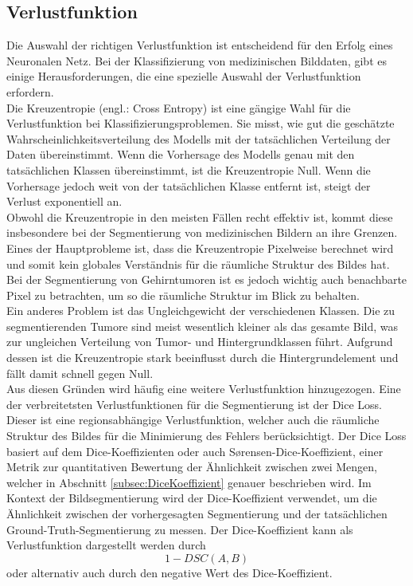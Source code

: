 \subsection{Verlustfunktion}
Die Auswahl der richtigen Verlustfunktion ist entscheidend für den Erfolg eines Neuronalen Netz. Bei der Klassifizierung von medizinischen Bilddaten, gibt es einige Herausforderungen, die eine spezielle Auswahl der Verlustfunktion erfordern.\\
Die Kreuzentropie (engl.: Cross Entropy) ist eine gängige Wahl für die Verlustfunktion bei Klassifizierungsproblemen. Sie misst, wie gut die geschätzte Wahrscheinlichkeitsverteilung des Modells mit der tatsächlichen Verteilung der Daten übereinstimmt. Wenn die Vorhersage des Modells genau mit den tatsächlichen Klassen übereinstimmt, ist die Kreuzentropie Null. Wenn die Vorhersage jedoch weit von der tatsächlichen Klasse entfernt ist, steigt der Verlust exponentiell an. \cite[vgl.][]{Murphy2012}\\
Obwohl die Kreuzentropie in den meisten Fällen recht effektiv ist, kommt diese insbesondere bei der Segmentierung von medizinischen Bildern an ihre Grenzen. Eines der Hauptprobleme ist, dass die Kreuzentropie Pixelweise berechnet wird und somit kein globales Verständnis für die räumliche Struktur des Bildes hat. Bei der Segmentierung von Gehirntumoren ist es jedoch wichtig auch benachbarte Pixel zu betrachten, um so die räumliche Struktur im Blick zu behalten. \\
Ein anderes Problem ist das Ungleichgewicht der verschiedenen Klassen. Die zu segmentierenden Tumore sind meist wesentlich kleiner als das gesamte Bild, was zur ungleichen Verteilung von Tumor- und Hintergrundklassen führt. Aufgrund dessen ist die Kreuzentropie stark beeinflusst durch die Hintergrundelement und fällt damit schnell gegen Null. \cite[][]{Yeung2021}\\
Aus diesen Gründen wird häufig eine weitere Verlustfunktion hinzugezogen. Eine der verbreitetsten Verlustfunktionen für die Segmentierung ist der Dice Loss. Dieser ist eine regionsabhängige Verlustfunktion, welcher auch die räumliche Struktur des Bildes für die Minimierung des Fehlers berücksichtigt. Der Dice Loss basiert auf dem Dice-Koeffizienten oder auch Sørensen-Dice-Koeffizient, einer Metrik zur quantitativen Bewertung der Ähnlichkeit zwischen zwei Mengen, welcher in Abschnitt \ref{subsec:DiceKoeffizient} genauer beschrieben wird. 
Im Kontext der Bildsegmentierung wird der Dice-Koeffizient verwendet, um die Ähnlichkeit zwischen der vorhergesagten Segmentierung und der tatsächlichen Ground-Truth-Segmentierung zu messen. Der Dice-Koeffizient kann als Verlustfunktion dargestellt werden durch 
\begin{equation}
  1 - DSC(A,B)
\end{equation}
oder alternativ auch durch den negative Wert des Dice-Koeffizient. \cite[vgl.][]{Sudre2017}\\

